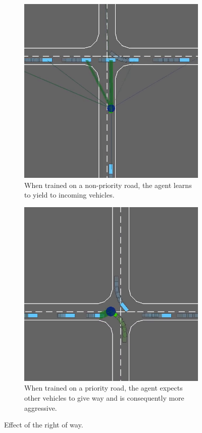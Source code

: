 \begin{figure}[htp]
	\centering
	\begin{subfigure}[t]{0.48\linewidth}
		\includegraphics[width=\linewidth]{img/priority1}
		\caption{When trained on a non-priority road, the agent learns to yield to incoming vehicles.}
	\end{subfigure}
	\begin{subfigure}[t]{0.48\linewidth}
		\includegraphics[width=\linewidth]{img/priority2}
		\caption{When trained on a priority road, the agent expects other vehicles to give way and is consequently more aggressive.}
	\end{subfigure}
	\caption{Effect of the right of way.}
	\label{fig:priority}
\end{figure}

